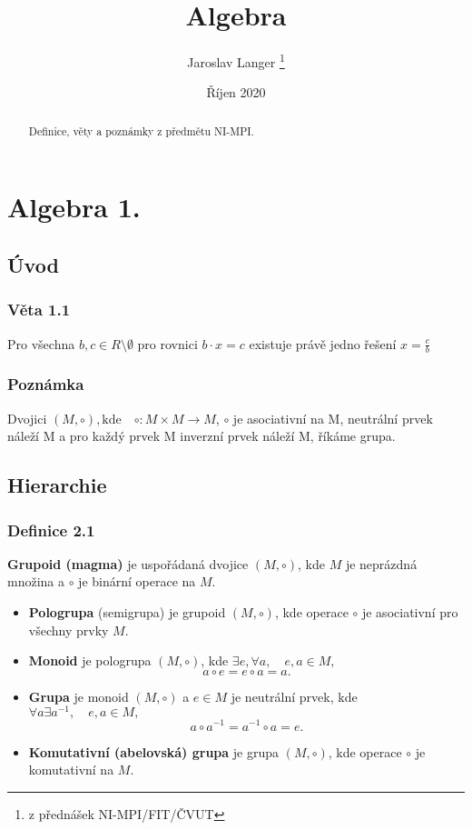 \documentclass[12pt, letterpaper]{article}
\title{Algebra}
\author{Jaroslav Langer \thanks{z přednášek NI-MPI/FIT/ČVUT}}
\date{Říjen 2020}
\begin{document}
\maketitle

\tableofcontents

\begin{abstract}
Definice, věty a poznámky z předmětu NI-MPI.
\end{abstract}

\section{Algebra 1.}

\subsection{Úvod}

\subsubsection*{Věta 1.1}
Pro všechna $b,c \in R \setminus \emptyset$ pro rovnici $b \cdot x = c$ existuje právě jedno řešení $x = \frac{c}{b}$

\subsubsection*{Poznámka}
Dvojici $(M, \circ), \textrm{kde} \quad \circ: M \times M \to M$,
$\circ$ je asociativní na M, neutrální prvek náleží M a pro každý prvek M inverzní prvek náleží M, říkáme grupa.

\subsection{Hierarchie}

\subsubsection*{Definice 2.1}
\textbf{Grupoid (magma)} je uspořádaná dvojice $(M, \circ)$,
kde $M$ je neprázdná množina a $\circ$ je binární operace na $M$.
\begin{itemize}
    \item \textbf{Pologrupa} (semigrupa) je grupoid $(M, \circ)$,
        kde operace $\circ$ je asociativní pro všechny prvky $M$.
    \item \textbf{Monoid} je pologrupa $(M, \circ)$,
        kde $\exists e, \forall a, \quad e,a \in M,$ \[a \circ e = e \circ a = a.\]
    \item \textbf{Grupa} je monoid $(M, \circ)$ a $e \in M$ je neutrální prvek,
        kde $\forall a \exists a^{-1}, \quad e,a \in M,$ \[a \circ a^{-1} = a^{-1} \circ a = e.\]
    \item \textbf{Komutativní (abelovská) grupa} je grupa $(M, \circ)$,
        kde operace $\circ$ je komutativní na $M$.
\end{itemize}
\end{document}
